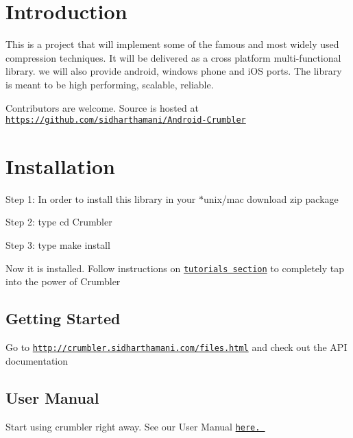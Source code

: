 \hypertarget{index_intro_sec}{}\section{Introduction}\label{index_intro_sec}
This is a project that will implement some of the famous and most widely used compression techniques. It will be delivered as a cross platform multi-\/functional library. we will also provide android, windows phone and i\-O\-S ports. The library is meant to be high performing, scalable, reliable.\par
 Contributors are welcome. Source is hosted at \href{https://github.com/sidharthamani/Android-Crumbler}{\tt https\-://github.\-com/sidharthamani/\-Android-\/\-Crumbler} \hypertarget{index_install_sec}{}\section{Installation}\label{index_install_sec}
Step 1\-: In order to install this library in your $\ast$unix/mac download zip package \par
 Step 2\-: type cd Crumbler \par
 Step 3\-: type make install \par
 Now it is installed. Follow instructions on \href{#}{\tt tutorials section} to completely tap into the power of Crumbler \hypertarget{index_xyz}{}\subsection{Getting Started}\label{index_xyz}
Go to \href{http://crumbler.sidharthamani.com/files.html}{\tt http\-://crumbler.\-sidharthamani.\-com/files.\-html} and check out the A\-P\-I documentation \par
 \hypertarget{index_ayz}{}\subsection{User Manual}\label{index_ayz}
Start using crumbler right away. See our User Manual \href{#}{\tt here. }